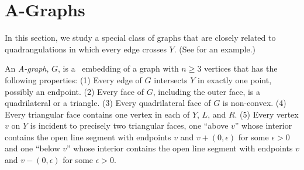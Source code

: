 \section{A-Graphs}

In this section, we study a special class of graphs that are closely
related to quadrangulations in which every edge crosses $Y$. (See  for an example.)

\begin{definition}
	An \emph{A-graph}, $G$, is a \Fary\ embedding of a graph with $n\ge 3$ vertices that has the following properties: (1) Every edge of $G$ intersects $Y$ in exactly one point, possibly an endpoint. (2) Every face of $G$, including the outer face, is a quadrilateral or a triangle. (3) Every quadrilateral face of $G$ is non-convex. (4) Every triangular face contains one vertex in each of $Y$, $L$, and $R$. (5) Every vertex $v$ on $Y$ is incident to precisely
		two triangular faces, one ``above $v$'' whose interior contains the open line segment with endpoints $v$ and $v+(0,\epsilon)$ for some $\epsilon>0$ and one ``below $v$'' whose interior contains the open line segment with endpoints $v$ and $v-(0,\epsilon)$ for some $\epsilon >0$.
\end{definition}

